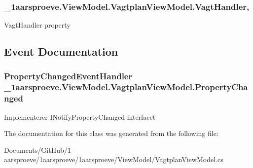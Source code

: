 \subsubsection[{Vagt\+Handler}]{ \+\_\+1aarsproeve.\+View\+Model.\+Vagtplan\+View\+Model.\+Vagt\+Handler\hspace{0.3cm}{\ttfamily [get]}, {\ttfamily [set]}}\label{class__1aarsproeve_1_1_view_model_1_1_vagtplan_view_model_acdf9517320f79372aaed5c644df493aa}


Vagt\+Handler property 



\subsection{Event Documentation}
\hypertarget{class__1aarsproeve_1_1_view_model_1_1_vagtplan_view_model_ac94848da2b60b3f4199b22427f3cf101}{}
\subsubsection[{Property\+Changed}]{\setlength{\rightskip}{0pt plus 5cm}Property\+Changed\+Event\+Handler \+\_\+1aarsproeve.\+View\+Model.\+Vagtplan\+View\+Model.\+Property\+Changed}\label{class__1aarsproeve_1_1_view_model_1_1_vagtplan_view_model_ac94848da2b60b3f4199b22427f3cf101}


Implementerer I\+Notify\+Property\+Changed interfacet 



The documentation for this class was generated from the following file\+:\begin{DoxyCompactItemize}
\item 
Documents/\+Git\+Hub/1-\/aarsproeve/1aarsproeve/1aarsproeve/\+View\+Model/Vagtplan\+View\+Model.\+cs\end{DoxyCompactItemize}
